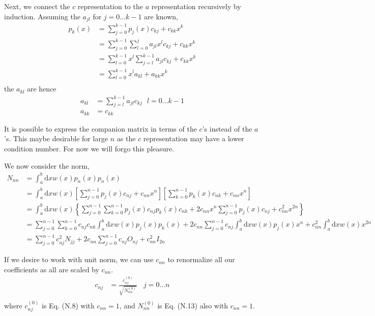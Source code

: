 \documentclass[paper=a4, fontsize=11pt]{article} %
\numberwithin{equation}{section} %
\numberwithin{figure}{section} %
\numberwithin{table}{section} %
\newcommand{\rd}{{\mathrm{d}}}
\begin{document}
Next, we connect the $c$ representation to the $a$ representation recursively by induction.
Assuming the $a_{jl}$ for $j = 0 \ldots k-1$ are known,   
\begin{equation}
\begin{split}
p_k(x) &= \sum_{j=0}^{k-1} p_{j}(x) c_{kj} + c_{kk} x^k \\
&= \sum_{j=0}^{k-1} \sum_{l=0}^j a_{jl} x^l c_{kj} + c_{kk} x^k \\
&= \sum_{l=0}^{k-1} x^l \sum_{j=l}^{k-1} a_{jl} c_{kj} + c_{kk} x^k \\
&= \sum_{l=0}^{k-1} x^l a_{kl} + a_{kk} x^k \\
\end{split}
\end{equation}
the $a_{kl}$ are hence
\begin{equation}
\begin{split}
a_{kl} &= \sum_{j=l}^{k-1} a_{jl} c_{kj} \ \ \ l=0 \ldots k-1 \\
a_{kk} &= c_{kk}
\end{split}
\end{equation}

It is possible to express the companion matrix in terms of the $c$'s instead of the $a$'s. This maybe desirable for large $n$ as the $c$ representation may have a lower condition number. For now we will forgo this pleasure.

We now consider the norm,
\begin{equation}
\begin{split}
N_{nn} &= \int_a^b \rd x w(x) p_n(x) p_n(x) \\
&= \int_a^b \rd x w(x) \left[\sum_{j=0}^{n-1} p_{j}(x) c_{nj} + c_{nn} x^n\right] \left[\sum_{k=0}^{n-1} p_{k}(x) c_{nk} + c_{nn} x^n\right] \\
&= \int_a^b \rd x w(x) \left\{\sum_{j=0}^{n-1} \sum_{k=0}^{n-1} p_{j}(x) c_{nj}p_{k}(x) c_{nk} + 2c_{nn} x^n \sum_{j=0}^{n-1} p_{j}(x) c_{nj} + c_{nn}^2 x^{2n}\right\} \\
&= \sum_{j=0}^{n-1} \sum_{k=0}^{n-1} c_{nj}c_{nk}\int_a^b \rd x w(x) p_{j}(x)p_{k}(x) + 2c_{nn}  \sum_{j=0}^{n-1} c_{nj} \int_a^b \rd x w(x) p_{j}(x)x^n + c_{nn}^2 \int_a^b \rd x w(x) x^{2n} \\
&= \sum_{j=0}^{n-1} c_{nj}^2 N_{jj} + 2c_{nn}  \sum_{j=0}^{n-1} c_{nj} O_{nj} + c_{nn}^2 I_{2n}
\end{split}
\end{equation}

If we desire to work with unit norm, we can use $c_{nn}$ to renormalize all our coefficients as all are scaled by $c_{nn}$.
\begin{equation}
\begin{split}
c_{nj} &= \frac{c_{nj}^{(0)}}{\sqrt{N_{nn}^{(0)}}}\ \ \ \ j = 0 \ldots n \\
\end{split}
\end{equation}
where $c_{nj}^{(0)}$ is Eq. (N.8) with $c_{nn} = 1$, and $N_{nn}^{(0)}$ is Eq. (N.13) also with $c_{nn} = 1$.
\end{document}
